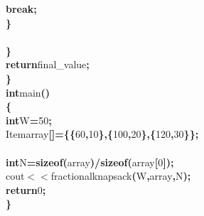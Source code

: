 \documentclass[a4paper, 10pt]{article}
\newcommand\SPC{\hspace*{0.6em}}
\newcommand\TAB{\hspace*{1.2em}}
\newcommand{\CppAIdentifier}[1]{#1}
\newcommand{\CppANumber}[1]{\textcolor[rgb]{0.5,0,0.5}{#1}}
\newcommand{\CppAReservedWord}[1]{\textbf{#1}}
\newcommand{\CppASpace}[1]{\colorbox[rgb]{1,1,1}{#1}}
\newcommand{\CppASymbol}[1]{\textbf{\textcolor[rgb]{1,0,0}{#1}}}
\begin{document}
\begin{ttfamily}
\CppASpace{\TAB \TAB \TAB }\CppAReservedWord{break}\CppASymbol{;}\\
\CppASpace{\TAB \TAB }\CppASymbol{\}}\CppASpace{\SPC }\\
\CppASpace{\TAB }\\
\CppASpace{\TAB }\CppASymbol{\}}\\
\CppASpace{\TAB }\CppAReservedWord{return}\CppASpace{\SPC }\CppAIdentifier{final\_value}\CppASymbol{;}\\
\CppASymbol{\}}\\
\CppAReservedWord{int}\CppASpace{\SPC }\CppAIdentifier{main}\CppASymbol{(}\CppASymbol{)}\\
\CppASymbol{\{}\\
\CppASpace{\TAB }\CppAReservedWord{int}\CppASpace{\SPC }\CppAIdentifier{W}\CppASymbol{=}\CppANumber{50}\CppASymbol{;}\\
\CppASpace{\TAB }\CppAIdentifier{Item}\CppASpace{\SPC }\CppAIdentifier{array}\CppASymbol{[}\CppASymbol{]}\CppASymbol{=}\CppASymbol{\{}\CppASymbol{\{}\CppANumber{60}\CppASymbol{,}\CppANumber{10}\CppASymbol{\}}\CppASymbol{,}\CppASymbol{\{}\CppANumber{100}\CppASymbol{,}\CppANumber{20}\CppASymbol{\}}\CppASymbol{,}\CppASymbol{\{}\CppANumber{120}\CppASymbol{,}\CppANumber{30}\CppASymbol{\}}\CppASymbol{\}}\CppASymbol{;}\\
\CppASpace{\TAB }\\
\CppASpace{\TAB }\CppAReservedWord{int}\CppASpace{\SPC }\CppAIdentifier{N}\CppASymbol{=}\CppAReservedWord{sizeof}\CppASymbol{(}\CppAIdentifier{array}\CppASymbol{)}\CppASymbol{/}\CppAReservedWord{sizeof}\CppASymbol{(}\CppAIdentifier{array}\CppASymbol{[}\CppANumber{0}\CppASymbol{]}\CppASymbol{)}\CppASymbol{;}\\
\CppASpace{\TAB }\CppAIdentifier{cout}\CppASymbol{$<$$<$}\CppAIdentifier{fractionalknapsack}\CppASymbol{(}\CppAIdentifier{W}\CppASymbol{,}\CppAIdentifier{array}\CppASymbol{,}\CppAIdentifier{N}\CppASymbol{)}\CppASymbol{;}\\
\CppASpace{\TAB }\CppAReservedWord{return}\CppASpace{\SPC }\CppANumber{0}\CppASymbol{;}\\
\CppASymbol{\}}\\

\end{ttfamily}
\end{document}
